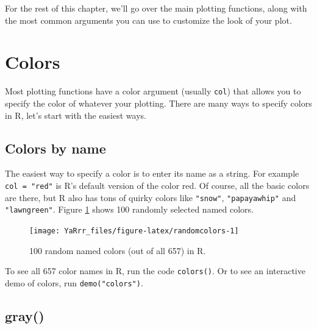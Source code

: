 \documentclass[]{book}
\theoremstyle{definition}
\theoremstyle{definition}
\theoremstyle{remark}
\begin{document}
For the rest of this chapter, we'll go over the main plotting functions,
along with the most common arguments you can use to customize the look
of your plot.

\section{Colors}\label{colors}

Most plotting functions have a color argument (usually \texttt{col})
that allows you to specify the color of whatever your plotting. There
are many ways to specify colors in R, let's start with the easiest ways.

\subsection{Colors by name}\label{colors-by-name}

The easiest way to specify a color is to enter its name as a string. For
example \texttt{col\ =\ "red"} is R's default version of the color red.
Of course, all the basic colors are there, but R also has tons of quirky
colors like \texttt{"snow"}, \texttt{"papayawhip"} and
\texttt{"lawngreen"}. Figure \ref{fig:randomcolors} shows 100 randomly
selected named colors.

\begin{figure}

{\centering \texttt{[image: YaRrr\_files/figure-latex/randomcolors-1]} 

}

\caption{100 random named colors (out of all 657) in R.}\label{fig:randomcolors}
\end{figure}

To see all 657 color names in R, run the code \texttt{colors()}. Or to
see an interactive demo of colors, run \texttt{demo("colors")}.

\subsection{gray()}\label{gray}
\end{document}
